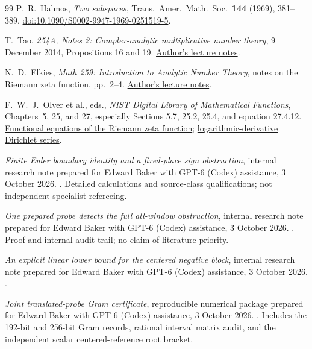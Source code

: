 \documentclass[11pt]{article}
\numberwithin{equation}{section}
\theoremstyle{definition}
\theoremstyle{remark}
\begin{document}
\begin{thebibliography}{99}
P.~R.~Halmos,
\emph{Two subspaces},
Trans.\ Amer.\ Math.\ Soc.\ \textbf{144} (1969), 381--389.
\href{https://doi.org/10.1090/S0002-9947-1969-0251519-5}
{doi:10.1090/S0002-9947-1969-0251519-5}.

T.~Tao,
\emph{254A, Notes 2: Complex-analytic multiplicative number theory},
9 December 2014, Propositions 16 and 19.
\href{https://terrytao.wordpress.com/2014/12/09/254a-notes-2-complex-analytic-multiplicative-number-theory/}
{Author's lecture notes}.

N.~D.~Elkies,
\emph{Math 259: Introduction to Analytic Number Theory},
notes on the Riemann zeta function, pp.~2--4.
\href{https://people.math.harvard.edu/~elkies/M259.02/zeta2.pdf}
{Author's lecture notes}.

F.~W.~J.~Olver et al., eds.,
\emph{NIST Digital Library of Mathematical Functions},
Chapters~5, 25, and 27, especially Sections 5.7, 25.2, 25.4,
and equation 27.4.12.
\href{https://dlmf.nist.gov/25.4}{Functional equations of the Riemann zeta function};
\href{https://dlmf.nist.gov/27.4.E12}{logarithmic-derivative Dirichlet series}.

\emph{Finite Euler boundary identity and a fixed-place sign obstruction},
internal research note prepared for Edward Baker with GPT-6 (Codex)
assistance, 3 October 2026.
.
Detailed calculations and source-class qualifications; not independent
specialist refereeing.


\emph{One prepared probe detects the full all-window obstruction},
internal research note prepared for Edward Baker with GPT-6 (Codex)
assistance, 3 October 2026.
.
Proof and internal audit trail; no claim of literature priority.

\emph{An explicit linear lower bound for the centered negative block},
internal research note prepared for Edward Baker with GPT-6 (Codex)
assistance, 3 October 2026.
.

\emph{Joint translated-probe Gram certificate},
reproducible numerical package prepared for Edward Baker with GPT-6
(Codex) assistance, 3 October 2026.
.
Includes the 192-bit and 256-bit Gram records, rational interval matrix
audit, and the independent scalar centered-reference root bracket.


\end{thebibliography}
\end{document}
